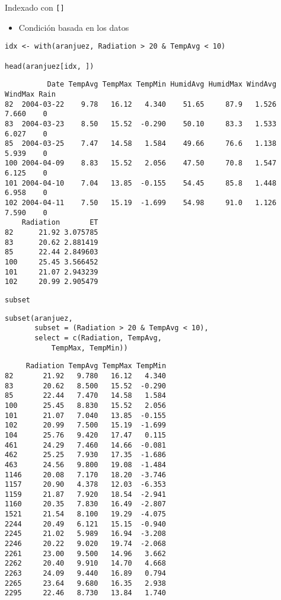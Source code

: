 \documentclass[xcolor={usenames,svgnames,dvipsnames}]{beamer}
\begin{document}
\begin{frame}[fragile,label={sec:orgffa6a08}]{Indexado con \texttt{[]}}
 \begin{itemize}
\item Condición basada en los datos
\end{itemize}
\lstset{language=r,label= ,caption= ,captionpos=b,numbers=none}
\begin{lstlisting}
idx <- with(aranjuez, Radiation > 20 & TempAvg < 10) 

head(aranjuez[idx, ])
\end{lstlisting}

\begin{verbatim}
          Date TempAvg TempMax TempMin HumidAvg HumidMax WindAvg WindMax Rain
82  2004-03-22    9.78   16.12   4.340    51.65     87.9   1.526   7.660    0
83  2004-03-23    8.50   15.52  -0.290    50.10     83.3   1.533   6.027    0
85  2004-03-25    7.47   14.58   1.584    49.66     76.6   1.138   5.939    0
100 2004-04-09    8.83   15.52   2.056    47.50     70.8   1.547   6.125    0
101 2004-04-10    7.04   13.85  -0.155    54.45     85.8   1.448   6.958    0
102 2004-04-11    7.50   15.19  -1.699    54.98     91.0   1.126   7.590    0
    Radiation       ET
82      21.92 3.075785
83      20.62 2.881419
85      22.44 2.849603
100     25.45 3.566452
101     21.07 2.943239
102     20.99 2.905479
\end{verbatim}
\end{frame}

\begin{frame}[fragile,label={sec:orgd828aa1}]{\texttt{subset}}
 \lstset{language=r,label= ,caption= ,captionpos=b,numbers=none}
\begin{lstlisting}
subset(aranjuez,
       subset = (Radiation > 20 & TempAvg < 10),
       select = c(Radiation, TempAvg,
           TempMax, TempMin))
\end{lstlisting}

\begin{verbatim}
     Radiation TempAvg TempMax TempMin
82       21.92   9.780   16.12   4.340
83       20.62   8.500   15.52  -0.290
85       22.44   7.470   14.58   1.584
100      25.45   8.830   15.52   2.056
101      21.07   7.040   13.85  -0.155
102      20.99   7.500   15.19  -1.699
104      25.76   9.420   17.47   0.115
461      24.29   7.460   14.66  -0.081
462      25.25   7.930   17.35  -1.686
463      24.56   9.800   19.08  -1.484
1146     20.08   7.170   18.20  -3.746
1157     20.90   4.378   12.03  -6.353
1159     21.87   7.920   18.54  -2.941
1160     20.35   7.830   16.49  -2.807
1521     21.54   8.100   19.29  -4.075
2244     20.49   6.121   15.15  -0.940
2245     21.02   5.989   16.94  -3.208
2246     20.22   9.020   19.74  -2.068
2261     23.00   9.500   14.96   3.662
2262     20.40   9.910   14.70   4.668
2263     24.09   9.440   16.89   0.794
2265     23.64   9.680   16.35   2.938
2295     22.46   8.730   13.84   1.740
\end{verbatim}
\end{frame}
\end{document}
